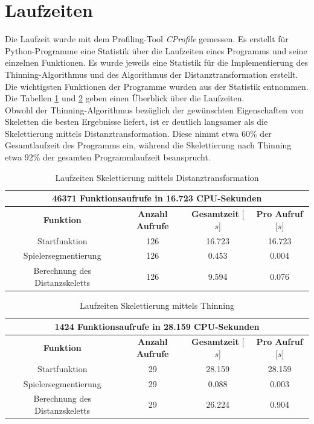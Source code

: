 \section{Laufzeiten}
Die Laufzeit wurde mit dem Profiling-Tool \emph{CProfile} gemessen. Es erstellt für Python-Programme eine Statistik über die Laufzeiten eines Programms und seine einzelnen Funktionen. Es wurde jeweils eine Statistik
für die Implementierung des Thinning-Algorithmus und des Algorithmus der Distanztransformation erstellt. Die
wichtigsten Funktionen der Programme wurden aus der Statistik entnommen. Die Tabellen \ref{tab:laufzeiten_distanztransformation} und \ref{tab:laufzeiten_thinning} geben einen
Überblick über die Laufzeiten. \\
Obwohl der Thinning-Algorithmus bezüglich der gewünschten Eigenschaften von Skeletten die besten Ergebnisse
liefert, ist er deutlich langsamer als die Skelettierung mittels
Distanztransformation. Diese nimmt etwa $60\%$ der Gesamtlaufzeit
des Programms ein, während die Skelettierung nach Thinning etwa
$92\%$ der gesamten Programmlaufzeit beansprucht. %
\begin{table}[htbp]
\begin{center}
\begin{tabular}{|c|c|c|c|}
 \hline
  \multicolumn{4}{|c|}{46371 Funktionsaufrufe in 16.723 CPU-Sekunden} \\
  \hline
\hline 
\textbf{Funktion} & \textbf{Anzahl Aufrufe} & \textbf{Gesamtzeit} [$s$] & \textbf{Pro Aufruf} [$s$]\\ 
\hline Startfunktion & 126 & 16.723 & 16.723 \\ 
\hline Spielersegmentierung & 126 & 0.453 & 0.004  \\ 
\hline Berechnung des Distanzskeletts & 126 & 9.594 & 0.076    \\ 
\hline 
\end{tabular} 
\end{center}
\caption{Laufzeiten Skelettierung mittels Distanztransformation}
\label{tab:laufzeiten_distanztransformation}
\end{table}
\begin{table}[htbp]
\begin{center}
\begin{tabular}{|c|c|c|c|}
 \hline
  \multicolumn{4}{|c|}{1424 Funktionsaufrufe in 28.159 CPU-Sekunden} \\
  \hline
\hline 
\textbf{Funktion} & \textbf{Anzahl Aufrufe} & \textbf{Gesamtzeit} [$s$] & \textbf{Pro Aufruf} [$s$]\\
\hline Startfunktion & 29 & 28.159 & 28.159 \\ 
\hline Spielersegmentierung & 29 & 0.088 & 0.003  \\ 
\hline Berechnung des Distanzskeletts & 29 & 26.224 & 0.904    \\ 
\hline 
\end{tabular} 
\end{center}
\caption{Laufzeiten Skelettierung mittels Thinning}
\label{tab:laufzeiten_thinning}
\end{table}
\newpage
